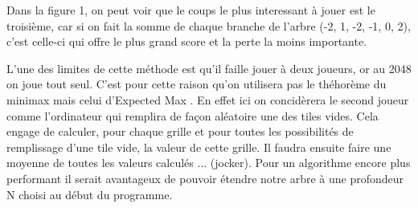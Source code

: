 \documentclass{article}
\begin{document}
Dans la figure 1, on peut voir que le coups le plus interessant à jouer est le troisi\`eme, car si on fait la somme de chaque branche de l'arbre (-2, 1, -2, -1, 0, 2), c'est celle-ci qui offre le plus grand score et la perte la moins importante.

L'une des limites de cette m\'ethode est qu'il faille jouer \`a deux joueurs, or au 2048 on joue tout seul. C'est pour cette raison qu'on utilisera pas le th\'ehor\`eme du \og minimax \fg{} mais celui d'\og Expected Max \fg{}. En effet ici on concid\`erera le second joueur comme l'ordinateur qui remplira de façon aléatoire une des tiles vides. Cela engage de calculer, pour chaque grille et pour toutes les possibilit\'es de remplissage d'une tile vide, la valeur de cette grille. Il faudra ensuite faire une moyenne de toutes les valeurs calculés ... (jocker). Pour un algorithme encore plus performant il serait avantageux de pouvoir \'etendre notre arbre \`a une profondeur N choisi au d\'ebut du programme. 
\end{document}
